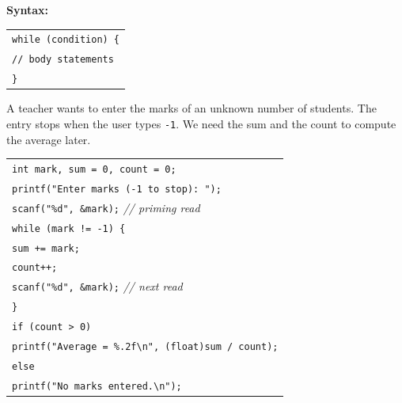 \documentclass[11pt]{article}
\newcommand{\legende}[1]{\par\vspace{6pt}{\popsemi\fontsize{9}{11.5}\selectfont\color{popmuted}#1}}
\begin{document}
\textbf{Syntax:}
\begin{center}
\begin{tabular}{l}
\texttt{while (condition) \{} \\
\qquad \texttt{// body statements} \\
\texttt{\}}
\end{tabular}
\end{center}

\begin{popfigure}
\legende{Flowchart of a \texttt{while} loop}
\end{popfigure}

\begin{exemplebox}
A teacher wants to enter the marks of an unknown number of students. The entry stops when the user types \texttt{-1}. We need the sum and the count to compute the average later.

\begin{center}
\begin{tabular}{l}
\texttt{int mark, sum = 0, count = 0;} \\
\texttt{printf("Enter marks (-1 to stop): ");} \\
\texttt{scanf("\%d", \&mark);} \quad \textit{// priming read} \\
\texttt{while (mark != -1) \{} \\
\qquad \texttt{sum += mark;} \\
\qquad \texttt{count++;} \\
\qquad \texttt{scanf("\%d", \&mark);} \quad \textit{// next read} \\
\texttt{\}} \\
\texttt{if (count > 0)} \\
\qquad \texttt{printf("Average = \%.2f\textbackslash n", (float)sum / count);} \\
\texttt{else} \\
\qquad \texttt{printf("No marks entered.\textbackslash n");}
\end{tabular}
\end{center}
\end{exemplebox}
\end{document}
